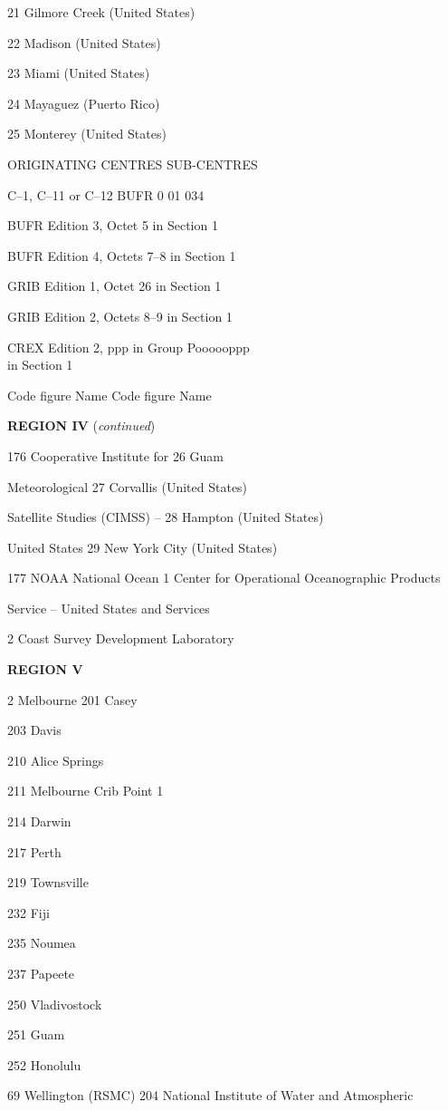 21 Gilmore Creek (United States)

22 Madison (United States)

23 Miami (United States)

24 Mayaguez (Puerto Rico)

25 Monterey (United States)

ORIGINATING CENTRES SUB-CENTRES

C--1, C--11 or C--12 BUFR 0 01 034

BUFR Edition 3, Octet 5 in Section 1

BUFR Edition 4, Octets 7--8 in Section 1

GRIB Edition 1, Octet 26 in Section 1

GRIB Edition 2, Octets 8--9 in Section 1

CREX Edition 2, ppp in Group Poooooppp\\
in Section 1

Code figure Name Code figure Name

\textbf{REGION IV} (\emph{continued})

176 Cooperative Institute for 26 Guam

Meteorological 27 Corvallis (United States)

Satellite Studies (CIMSS) -- 28 Hampton (United States)

United States 29 New York City (United States)

177 NOAA National Ocean 1 Center for Operational Oceanographic Products

Service -- United States and Services

2 Coast Survey Development Laboratory

\textbf{REGION V}

2 Melbourne 201 Casey

203 Davis

210 Alice Springs

211 Melbourne Crib Point 1

214 Darwin

217 Perth

219 Townsville

232 Fiji

235 Noumea

237 Papeete

250 Vladivostock

251 Guam

252 Honolulu

69 Wellington (RSMC) 204 National Institute of Water and Atmospheric

